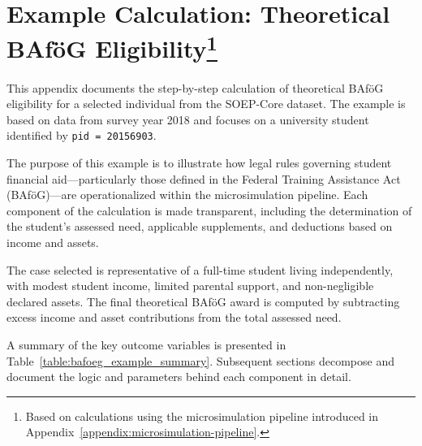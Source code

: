 

\newpage
\section[Example Calculation: Theoretical BAföG Eligibility]{Example Calculation: Theoretical BAföG Eligibility\footnote{Based on calculations using the microsimulation pipeline introduced in Appendix~\ref{appendix:microsimulation-pipeline}.}}
\label{appendix:bafoeg-example}

This appendix documents the step-by-step calculation of theoretical BAföG eligibility for a selected individual from the SOEP-Core dataset. The example is based on data from survey year 2018 and focuses on a university student identified by \texttt{pid = 20156903}.

The purpose of this example is to illustrate how legal rules governing student financial aid—particularly those defined in the Federal Training Assistance Act (BAföG)—are operationalized within the microsimulation pipeline. Each component of the calculation is made transparent, including the determination of the student's assessed need, applicable supplements, and deductions based on income and assets.

The case selected is representative of a full-time student living independently, with modest student income, limited parental support, and non-negligible declared assets. The final theoretical BAföG award is computed by subtracting excess income and asset contributions from the total assessed need.

A summary of the key outcome variables is presented in Table~\ref{table:bafoeg_example_summary}. Subsequent sections decompose and document the logic and parameters behind each component in detail.







